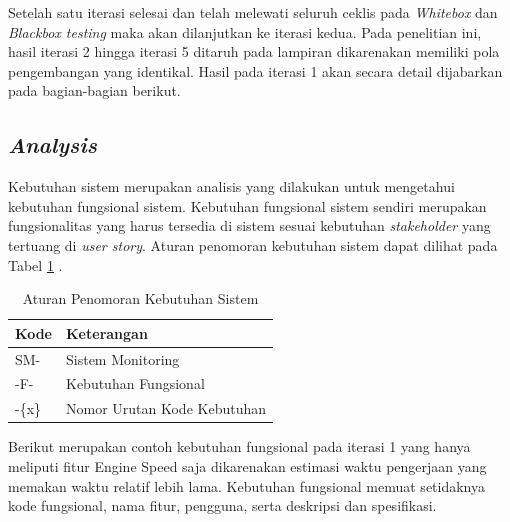 Setelah satu iterasi selesai dan telah melewati seluruh ceklis pada \textit{Whitebox} dan \textit{Blackbox testing} maka akan dilanjutkan ke iterasi kedua. Pada penelitian ini, hasil iterasi 2 hingga iterasi 5 ditaruh pada lampiran dikarenakan memiliki pola pengembangan yang identikal. Hasil pada iterasi 1 akan secara detail dijabarkan pada bagian-bagian berikut.

\subsection{\textit{Analysis}}

Kebutuhan sistem merupakan analisis yang dilakukan untuk mengetahui kebutuhan fungsional sistem. Kebutuhan fungsional sistem sendiri merupakan fungsionalitas yang harus tersedia di sistem sesuai kebutuhan \textit{stakeholder} yang tertuang di \textit{user story}. Aturan penomoran kebutuhan sistem dapat dilihat pada Tabel \ref{tab:aturan-penomoran} .

\begin{table}[!h]
    \caption{Aturan Penomoran Kebutuhan Sistem}
    \centering
    \begin{tabular}
        {
            >{\centering\arraybackslash}p{}
            >{\centering\arraybackslash}p{}
        }
        \toprule

        Kode &
        Keterangan \\ [1ex]

        \midrule

        SM- & Sistem Monitoring \\
        -F- & Kebutuhan Fungsional \\
        -\{x\} & Nomor Urutan Kode Kebutuhan \\

        \bottomrule
    \end{tabular}
    \label{tab:aturan-penomoran}
\end{table}

\newpage

Berikut merupakan contoh kebutuhan fungsional pada iterasi 1 yang hanya meliputi fitur Engine Speed saja dikarenakan estimasi waktu pengerjaan yang memakan waktu relatif lebih lama. Kebutuhan fungsional memuat setidaknya kode fungsional, nama fitur, pengguna, serta deskripsi dan spesifikasi.

